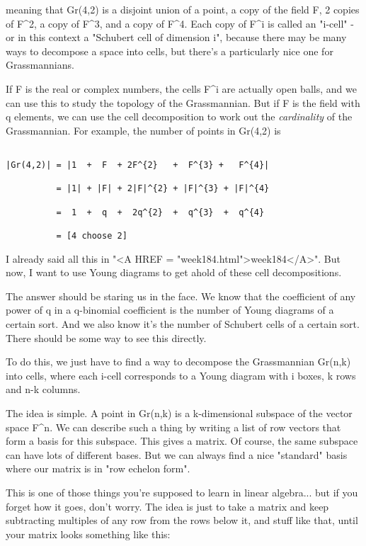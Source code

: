 $$
    
meaning that Gr(4,2) is a disjoint union of a point, a copy of the field
F, 2 copies of F^{2}, a copy of F^{3}, and a copy of
F^{4}.  Each copy of F^{i} is called an
"i-cell" - or in this context a "Schubert cell of
dimension i", because there may be many ways to decompose a space
into cells, but there's a particularly nice one for Grassmannians.

If F is the real or complex numbers, the cells F^{i} are actually open
balls, and we can use this to study the topology of the Grassmannian. 
But if F is the field with q elements, we can use the cell decomposition
to work out the \emph{cardinality} of the Grassmannian.  For example, the
number of points in Gr(4,2) is


\begin{verbatim}

|Gr(4,2)| = |1  +  F  + 2F^{2}   +  F^{3} +   F^{4}|

          = |1| + |F| + 2|F|^{2} + |F|^{3} + |F|^{4}

          =  1  +  q  +  2q^{2}  +  q^{3}  +  q^{4}
 
          = [4 choose 2]
\end{verbatim}
    
I already said all this in "<A HREF =
"week184.html">week184</A>".  But now, I want to use Young diagrams
to get ahold of these cell decompositions.

The answer should be staring us in the face.  We know that the
coefficient of any power of q in a q-binomial coefficient is the number
of Young diagrams of a certain sort.  And we also know it's the number of
Schubert cells of a certain sort.  There should be some way to see this
directly.

To do this, we just have to find a way to decompose the Grassmannian Gr(n,k)
into cells, where each i-cell corresponds to a Young diagram with i boxes, 
k rows and n-k columns.

The idea is simple.  A point in Gr(n,k) is a k-dimensional subspace of
the vector space F^{n}.  
We can describe such a thing by writing a list of
row vectors that form a basis for this subspace.  This gives a matrix.
Of course, the same subspace can have lots of different bases.  But we
can always find a nice "standard" basis where our matrix is in
"row echelon form".

This is one of those things you're supposed to learn in linear algebra... 
but if you forget how it goes, don't worry.  The idea is just to take a
matrix and keep subtracting multiples of any row from the rows below it,
and stuff like that, until your matrix looks something like this:
               

